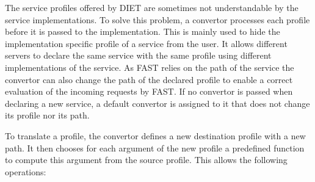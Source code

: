 The service profiles offered by DIET are sometimes not
understandable by the service implementations. To solve this problem,
a convertor processes each profile before it is passed to the
implementation. This is mainly used to
hide the implementation specific profile of a service from
the user. It allows different servers to declare the same
service with the same profile using different implementations
of the service. As FAST relies on the path of the service the
convertor can also change the path of the declared profile to
enable a correct evaluation of the incoming requests by FAST.
If no convertor is passed when declaring a new service, a
default convertor is assigned to it that does not change its
profile nor its path.

To translate a profile, the convertor defines a new
destination profile with a new path. It then chooses for
each argument of the new profile a predefined function
to compute this argument from the source profile. This
allows the following operations:

